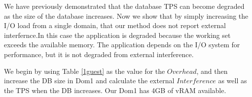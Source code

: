 We have previously demonstrated that the database TPS can become degraded as the size of the database increases.  Now we show that by simply increasing the I/O load from a single domain, that our method does not report external interfernce.In this case the application is degraded because the working set exceeds the available memory.  The application depends on the I/O system for performance, but it is not degraded from external interference.

We begin by using Table \ref{1guest} as the value for the $Overhead$, and then increase the DB size in Dom1 and calculate the external $Interference$ as well as the TPS when the DB increases.  Our Dom1 has 4GB of vRAM available.



